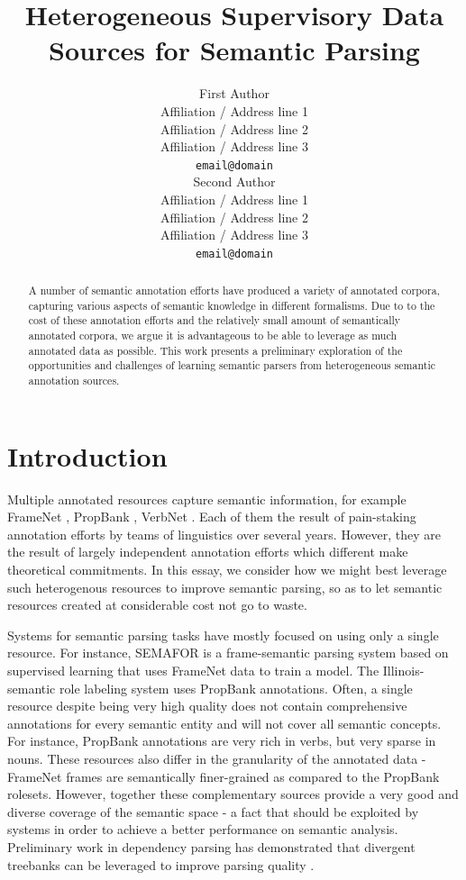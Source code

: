 \documentclass[11pt]{article}
\title{Heterogeneous Supervisory Data Sources for Semantic Parsing}
\author{First Author \\
  Affiliation / Address line 1 \\
  Affiliation / Address line 2 \\
  Affiliation / Address line 3 \\
  {\tt email@domain} \\\And
  Second Author \\
  Affiliation / Address line 1 \\
  Affiliation / Address line 2 \\
  Affiliation / Address line 3 \\
  {\tt email@domain} \\}
\date{}
\begin{document}
\maketitle
\begin{abstract}
A number of semantic annotation efforts have produced a variety of annotated corpora, capturing various aspects of semantic knowledge in different formalisms. Due to to the cost of these annotation efforts and the relatively small amount of semantically annotated corpora, we argue it is advantageous to be able to leverage as much annotated data as possible. This work presents a preliminary exploration of the opportunities and challenges of learning semantic parsers from heterogeneous semantic annotation sources. 
\end{abstract}

\section{Introduction}
Multiple annotated resources capture semantic information, for example FrameNet \citep{framenet}, PropBank \citep{propbank}, VerbNet \citep{vnet}. Each of them the result of pain-staking annotation efforts by teams of linguistics over several years. However, they are the result of largely independent annotation efforts which different make theoretical commitments. In this essay, we consider how we might best leverage such heterogenous resources to improve semantic parsing, so as to let semantic resources created at considerable cost not go to waste.

Systems for semantic parsing tasks have mostly focused on using only a single resource. For instance, SEMAFOR \citep{semafor} is a frame-semantic parsing system based on supervised learning that uses FrameNet data to train a model. The Illinois-semantic role labeling system \citep{illinoisSRL} uses PropBank annotations. Often, a single resource despite being very high quality does not contain comprehensive annotations for every semantic entity and will not cover all semantic concepts. For instance, PropBank annotations are very rich in verbs, but very sparse in nouns. These resources also differ in the granularity of the annotated data - FrameNet frames are semantically finer-grained as compared to the PropBank rolesets. However, together these complementary sources provide a very good and diverse coverage of the semantic space - a fact that should be exploited by systems in order to achieve a better performance on semantic analysis. Preliminary work in dependency parsing has demonstrated that divergent treebanks can be leveraged to improve parsing quality \citep{zhou:2013}.
\end{document}
